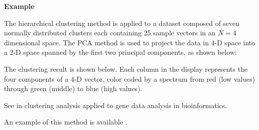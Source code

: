 \documentclass{article}
\begin{document}
\begin{comment}
Unsupervised clustering can also be implemented hierarchically in a top-down 
manner. The algorithm generates a binary tree by recursively partitioning 
all patterns, treated as vectors in an N-dimensional vector space, into two 
sub-groups in the following two steps:
\begin{enumerate}
\item Compute the covariance matrix of the samples and then apply PCA method.
  Specifically, find the eigenvector ${\bf \phi}$ of the covariance matrix 
  ${\bf \Sigma}$ corresponding to the largest eigenvalue $\lambda$. Project
  all patterns ${\bf x}$ onto a 1-D space:
  \begin{equation} x={\bf x}^T {\bf \phi} \end{equation}
\item Sort all data point along this 1-D space and partition them into two
  subgroups with maximum between-group (Bhattacharyya) distance.
\item Recursively carry out the two steps above to each subgroup, until 
  each subgroup contains only one pattern. Alternatively, the recursion can
  be terminated when certain criterion is satisfied.
\end{enumerate}

\end{comment}

{\bf Example}

The hierarchical clustering method is applied to a dataset composed of
seven normally distributed clusters each containing 25 sample vectors in an $N=4$
dimensional space. The PCA method is used to project the data in 4-D space into 
a 2-D space spanned by the first two principal components, as shown below:


The clustering result is shown below. Each column in the display represents the
four components of a 4-D vector, color coded by a spectrum from red (low values)
through green (middle) to blue (high values).


See 
 in clustering analysis applied to gene data analysis in bioinformatics.

An example of this method is available .
\end{document}
